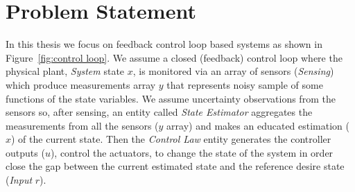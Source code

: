 \documentclass[ twoside, 12pt ]{article}
\newcommand{\commentOut}[1]{}
\begin{document}
\commentOut{ %
In this work we show how to combine the efficiency of dynamic scheduling with the predictability of real-time scheduling, in a way that is more suitable for control systems then periods and deadlines.
We show that applying control computations at dynamically adjustable periodic, and with variable computational demands, based on real-time information, allows for better utilization of the computational resources and therefor better control performance.

The main innovation of this work is the system architecture design.
In practice most of the real-time control systems designs consists of to separated elements, (1) control and estimations tasks, and (2) a task scheduler which divide the resources (CPU time) between all tasks. 
Although those two parts are constantly affected by each other they barely communicate, this lead to static (constant) scheduling regardless of the current state or needs of the system.
In this thesis we develop an architecture design for control systems in witch the scheduler (2) is aware of the current state of the system, and makes \textit{state depended} scheduling for that state. 
We show how allocate resources by \textbf{current} needs give better resoults than allocate resources for the \textbf{worst-case} needs.
}
 
\section{Problem Statement}
\label{sec:Problem}
In this thesis we focus on feedback control loop based systems as shown in Figure~\ref{fig:control loop}. 
We assume a closed (feedback) control loop where the physical plant, \textit{System} state $x$, is monitored via an array of sensors (\textit{Sensing}) which produce measurements array $y$ that represents noisy sample of some functions of the state variables. 
We assume uncertainty observations from the sensors so, after sensing, an entity called \textit{State Estimator} aggregates the measurements from all the sensors ($y$ array) and makes an educated estimation ($\hat{x}$) of the current state. Then the \textit{Control Law} entity generates the controller outputs ($u$), control the actuators, to change the state of the system in order close the gap between the current estimated state and the reference desire state (\textit{Input} $r$).
\end{document}

